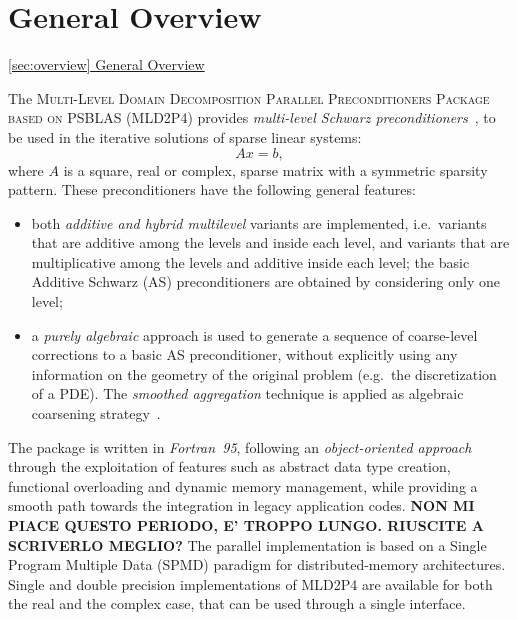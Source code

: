 \section{General Overview\label{sec:overview}}

         {\underline{\ref{sec:overview} General Overview}}

The \textsc{Multi-Level Domain Decomposition Parallel Preconditioners Package based on
PSBLAS (MLD2P4}) provides \emph{multi-level Schwarz preconditioners}~\cite{dd2_96},
to be used in the iterative solutions of sparse linear systems:
\begin{equation} 
Ax=b, 
\label{system1}
\end{equation} 
where $A$ is a square, real or complex, sparse matrix with a symmetric sparsity pattern.
%
%
These preconditioners have the following general features:
\begin{itemize}
\item both \emph{additive and hybrid multilevel} variants are implemented,
i.e.\ variants that are additive among the levels and inside each level, and variants
that are multiplicative among the levels and additive inside each level; the basic Additive Schwarz (AS) preconditioners are obtained by considering only one level;
\item a \emph{purely algebraic} approach is used to
generate a sequence of coarse-level corrections to a basic AS preconditioner, without
explicitly using any information on the geometry of the original problem (e.g.\ the
discretization of a PDE). The \emph{smoothed aggregation} technique is applied
as algebraic coarsening strategy~\cite{BREZINA_VANEK,VANEK_MANDEL_BREZINA}.
\end{itemize}

The package is written in \emph{Fortran~95}, following an \emph{object-oriented approach}
through the exploitation of features such as abstract data type creation, functional
overloading and dynamic memory management, while providing a smooth path towards the integration in legacy application codes.
\textbf{NON MI PIACE QUESTO PERIODO, E' TROPPO LUNGO. RIUSCITE A SCRIVERLO MEGLIO?}
The parallel implementation is based
on a Single Program Multiple Data (SPMD) paradigm for distributed-memory architectures. 
Single and double precision implementations of MLD2P4 are available for both the
real and the complex case, that can be used through a single interface.


